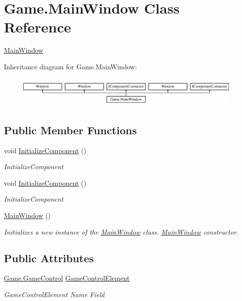 \hypertarget{class_game_1_1_main_window}{}\section{Game.\+Main\+Window Class Reference}
\label{class_game_1_1_main_window}


\mbox{\hyperlink{class_game_1_1_main_window}{Main\+Window}}  


Inheritance diagram for Game.\+Main\+Window\+:\begin{figure}[H]
\begin{center}
\leavevmode
\includegraphics[height=1.544828cm]{class_game_1_1_main_window}
\end{center}
\end{figure}
\subsection*{Public Member Functions}
\begin{DoxyCompactItemize}
\item 
void \mbox{\hyperlink{class_game_1_1_main_window_adfb69762c50d8d3d7c1e3c2df69c4281}{Initialize\+Component}} ()
\begin{DoxyCompactList}\small\item\em Initialize\+Component \end{DoxyCompactList}\item 
void \mbox{\hyperlink{class_game_1_1_main_window_adfb69762c50d8d3d7c1e3c2df69c4281}{Initialize\+Component}} ()
\begin{DoxyCompactList}\small\item\em Initialize\+Component \end{DoxyCompactList}\item 
\mbox{\hyperlink{class_game_1_1_main_window_a525da08523cd401440097c57b07f4bf2}{Main\+Window}} ()
\begin{DoxyCompactList}\small\item\em Initializes a new instance of the \mbox{\hyperlink{class_game_1_1_main_window}{Main\+Window}} class. \mbox{\hyperlink{class_game_1_1_main_window}{Main\+Window}} constructor. \end{DoxyCompactList}\end{DoxyCompactItemize}
\subsection*{Public Attributes}
\begin{DoxyCompactItemize}
\item 
\mbox{\hyperlink{class_game_1_1_game_control}{Game.\+Game\+Control}} \mbox{\hyperlink{class_game_1_1_main_window_ab3d2bf59d20ea9c2dd123d23229b1c7b}{Game\+Control\+Element}}
\begin{DoxyCompactList}\small\item\em Game\+Control\+Element Name Field \end{DoxyCompactList}\end{DoxyCompactItemize}
